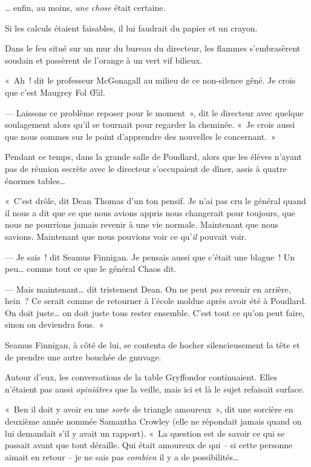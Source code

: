 … enfin, au moins, \emph{une chose} était certaine.

Si les calculs étaient faisables, il lui faudrait du papier et un crayon.

Dans le feu situé sur un mur du bureau du directeur, les flammes s'embrasèrent soudain et passèrent de l'orange à un vert vif bilieux.

«~Ah~! dit le professeur McGonagall au milieu de ce non-silence gêné.
Je crois que c'est Maugrey Fol Œil.

--- Laissons ce problème reposer pour le moment~», dit le directeur avec quelque soulagement alors qu'il se tournait pour regarder la cheminée.
«~Je crois aussi que nous sommes sur le point d'apprendre des nouvelles le concernant.~»


Pendant ce temps, dans la grande salle de Poudlard, alors que les élèves n'ayant pas de réunion secrète avec le directeur s'occupaient de dîner, assis à quatre énormes tables…

«~C'est drôle, dit Dean Thomas d'un ton pensif.
Je n'ai pas cru le général quand il nous a dit que ce que nous avions appris nous changerait pour toujours, que nous ne pourrions jamais revenir à une vie normale.
Maintenant que nous savions.
Maintenant que nous pouvions voir ce qu'\emph{il} pouvait voir.

--- Je sais~! dit Seamus Finnigan.
Je pensais aussi que c'était une blague~!
Un peu… comme tout ce que le général Chaos dit.

--- Mais maintenant… dit tristement Dean.
On ne peut \emph{pas} revenir en arrière, hein~?
Ce serait comme de retourner à l'école moldue après avoir été à Poudlard.
On doit juste… on doit juste tous rester ensemble.
C'est tout ce qu'on peut faire, sinon on deviendra fous.~»

Seamus Finnigan, à côté de lui, se contenta de hocher silencieusement la tête et de prendre une autre bouchée de gnuvage.

Autour d'eux, les conversations de la table Gryffondor continuaient.
Elles n'étaient pas aussi \emph{opiniâtres} que la veille, mais ici et là le sujet refaisait surface.

«~Ben il doit y avoir eu une \emph{sorte} de triangle amoureux~», dit une sorcière en deuxième année nommée Samantha Crowley (elle ne répondait jamais quand on lui demandait s'il y avait un rapport).
«~La question est de savoir ce qui se passait avant que tout déraille.
Qui était amoureux de qui -- si cette personne aimait en retour -- je ne sais pas \emph{combien} il y a de possibilités…

